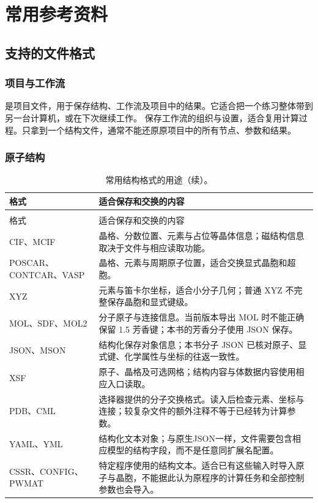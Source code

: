 \chapter{常用参考资料}\label{ch:reference}


\section{支持的文件格式}

\subsection{项目与工作流}

 是项目文件，用于保存结构、工作流及项目中的结果。它适合把一个练习整体带到另一台计算机，或在下次继续工作。 保存工作流的组织与设置，适合复用计算过程。只拿到一个结构文件，通常不能还原原项目中的所有节点、参数和结果。

\Needspace{38mm}
\subsection{原子结构}

\begin{longtable}{>{\raggedright\arraybackslash}p{.34\linewidth}>{\raggedright\arraybackslash}p{}}
\caption{常用结构格式的用途。}\\
\toprule
格式 & 适合保存和交换的内容 \\
\midrule
\endfirsthead
\caption[]{常用结构格式的用途（续）。}\\
\toprule
格式 & 适合保存和交换的内容 \\
\midrule
\endhead
\bottomrule
\endfoot
\bottomrule
\endlastfoot
CIF、MCIF & 晶格、分数位置、元素与占位等晶体信息；磁结构信息取决于文件与相应读取功能。\\
POSCAR、CONTCAR、VASP & 晶格、元素与周期原子位置，适合交换显式晶胞和超胞。\\
XYZ & 元素与笛卡尔坐标，适合小分子几何；普通 XYZ 不完整保存晶胞和显式键级。\\
MOL、SDF、MOL2 & 分子原子与连接信息。当前版本导出 MOL 时不能正确保留 1.5 芳香键；本书的芳香分子使用 JSON 保存。\\
JSON、MSON & 结构化保存对象信息；本书分子 JSON 已核对原子、显式键、化学属性与坐标的往返一致性。\\
XSF & 原子、晶格及可选网格；结构内容与体数据内容使用相应入口读取。\\
PDB、CML & 选择器提供的分子交换格式。读入后检查元素、坐标与连接；较复杂文件的额外注释不等于已经转为计算参数。\\
YAML、YML & 结构化文本对象；与原生JSON一样，文件需要包含相应模型的结构字段，而不是任意同扩展名配置。\\
CSSR、CONFIG、PWMAT & 特定程序使用的结构文本。适合已有这些输入时导入原子与晶胞，不能据此认为原程序的计算任务和全部控制参数也会导入。\\
\end{longtable}

